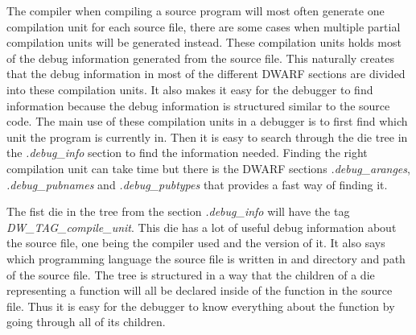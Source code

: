  


The compiler when compiling a source program will most often generate one compilation unit for each source file, there are some cases when multiple partial compilation units will be generated instead.
These compilation units holds most of the debug information generated from the source file.
This naturally creates that the debug information in most of the different \gls{DWARF} sections are divided into these compilation units.
It also makes it easy for the debugger to find information because the debug information is structured similar to the source code.
The main use of these compilation units in a debugger is to first find which unit the program is currently in.
Then it is easy to search through the \gls{die} \gls{tree} in the \emph{.debug\_info} section to find the information needed. 
Finding the right compilation unit can take time but there is the \gls{DWARF} sections \emph{.debug\_aranges}, \emph{.debug\_pubnames} and \emph{.debug\_pubtypes} that provides a fast way of finding it.


The fist \gls{die} in the \gls{tree} from the section \emph{.debug\_info} will have the tag \emph{DW\_TAG\_compile\_unit}.
This \gls{die} has a lot of useful debug information about the source file, one being the compiler used and the version of it.
It also says which programming language the source file is written in and directory and path of the source file.
The \gls{tree} is structured in a way that the children of a \gls{die} representing a function will all be declared inside of the function in the source file.
Thus it is easy for the debugger to know everything about the function by going through all of its children.

